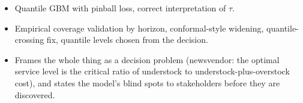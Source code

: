 \begin{interviewq}

\goodgreat
\begin{itemize}
    \item {} Quantile GBM with pinball loss, correct interpretation of $\tau$.
    \item {} Empirical coverage validation by horizon, conformal-style widening, quantile-crossing fix, quantile levels chosen from the decision.
    \item {} Frames the whole thing as a decision problem (newsvendor: the optimal service level is the critical ratio of understock to understock-plus-overstock cost), and states the model's blind spots to stakeholders before they are discovered.
\end{itemize}

\end{interviewq}

